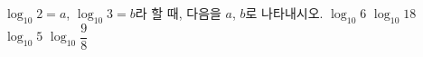 $\log_{10} 2=a$, $\log_{10} 3=b$라 할 때, 다음을 $a$, $b$로 나타내시오.
 $\log_{10} 6$
 $\log_{10} 18$
 $\log_{10} 5$
 $\log_{10} \dfrac{9}{8}$

